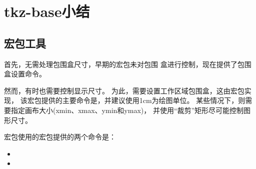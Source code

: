 \documentclass[../main.tex]{subfiles}
\begin{document}
\section{tkz-base小结}

\subsection{宏包工具}

首先，无需处理\TIKZ{}包围盒尺寸，早期的宏包未对包围
盒进行控制，现在提供了包围盒设置命令。

然而，有时也需要控制显示尺寸。
为此，需要设置工作区域包围盒，这由宏包实现，
该宏包提供的主要命令是，并建议使用1cm为绘图单位。
某些情况下，则需要指定画布大小(xmin、xmax、ymin和ymax)，
并使用\enquote{裁剪}矩形尽可能控制图形尺寸。

宏包使用的宏包提供的两个命令是：

\begin{itemize}
   \item {}
   \item {}
\end{itemize}
\vspace{20pt}
\end{document}
